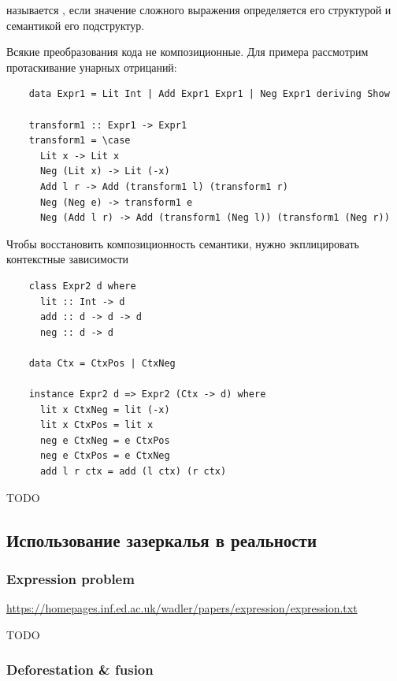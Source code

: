  называется , если значение сложного выражения определяется его структурой и семантикой его подструктур.

Всякие преобразования кода не композиционные.
Для примера рассмотрим протаскивание унарных отрицаний:
\begin{verbatim}
    data Expr1 = Lit Int | Add Expr1 Expr1 | Neg Expr1 deriving Show

    transform1 :: Expr1 -> Expr1
    transform1 = \case
      Lit x -> Lit x
      Neg (Lit x) -> Lit (-x)
      Add l r -> Add (transform1 l) (transform1 r)
      Neg (Neg e) -> transform1 e
      Neg (Add l r) -> Add (transform1 (Neg l)) (transform1 (Neg r))
\end{verbatim}

Чтобы восстановить композиционность семантики, нужно экплицировать контекстные зависимости
\begin{verbatim}
    class Expr2 d where
      lit :: Int -> d
      add :: d -> d -> d
      neg :: d -> d

    data Ctx = CtxPos | CtxNeg

    instance Expr2 d => Expr2 (Ctx -> d) where
      lit x CtxNeg = lit (-x)
      lit x CtxPos = lit x
      neg e CtxNeg = e CtxPos
      neg e CtxPos = e CtxNeg
      add l r ctx = add (l ctx) (r ctx)
\end{verbatim}

TODO %


\subsection{Использование зазеркалья в реальности}

\subsubsection{Expression problem}

\url{https://homepages.inf.ed.ac.uk/wadler/papers/expression/expression.txt}



TODO %

\subsubsection{Deforestation \& fusion}

